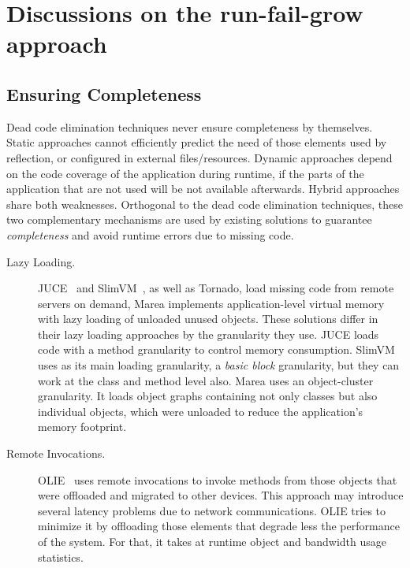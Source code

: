 \section{Discussions on the run-fail-grow approach} \label{sec:discussion}

\subsection{Ensuring Completeness} \label{section:safety}

Dead code elimination techniques never ensure completeness by themselves. Static approaches cannot efficiently predict the need of those elements used by reflection, or configured in external files/resources. Dynamic approaches depend on the code coverage of the application during runtime, \ie if the parts of the application that are not used will be not available afterwards. Hybrid approaches share both weaknesses. Orthogonal to the dead code elimination techniques, these two complementary mechanisms are used by existing solutions to guarantee \emph{completeness} and avoid runtime errors due to missing code.

\begin{description}
\item[Lazy Loading.] JUCE~\cite{Popa04a,Teod01a} and SlimVM~\cite{Kers09a, Wagn11a}, as well as Tornado, load missing code from remote servers on demand, Marea\cite{Mart12a} implements application-level virtual memory with lazy loading of unloaded unused objects. These solutions differ in their lazy loading approaches by the granularity they use. JUCE loads code with a method granularity to control memory consumption. SlimVM uses as its main loading granularity, a \emph{basic block} granularity, but they can work at the class and method level also. Marea uses an object-cluster granularity. It loads object graphs containing not only classes but also individual objects, which were unloaded to reduce the application's memory footprint.
\item[Remote Invocations.] OLIE~\cite{Gu03a} uses remote invocations to invoke methods from those objects that were offloaded and migrated to other devices. This approach may introduce several latency problems due to network communications. OLIE tries to minimize it by offloading those elements that degrade less the performance of the system. For that, it takes at runtime object and bandwidth usage statistics.
\end{description}


